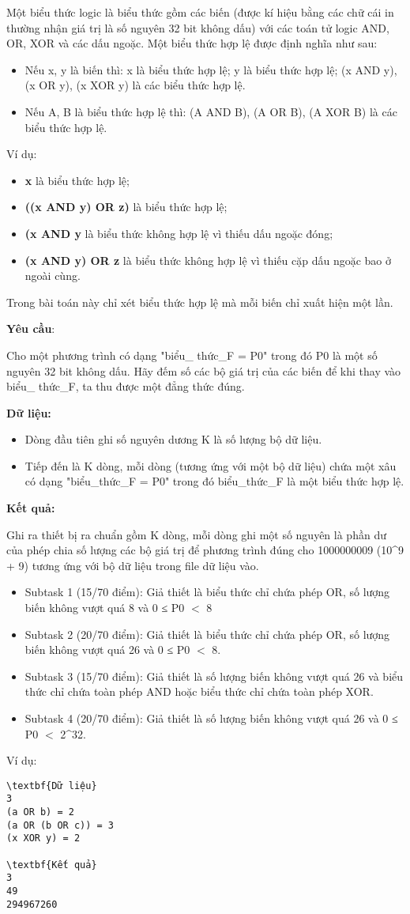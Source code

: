 

Một biểu thức logic là biểu thức gồm các biến (được kí hiệu bằng các chữ cái in thường nhận giá trị là số nguyên 32 bit không dấu) với các toán tử logic AND, OR, XOR và các dấu ngoặc. Một biểu thức hợp lệ được định nghĩa như sau:
\begin{itemize}
	\item Nếu x, y là biến thì: x là biểu thức hợp lệ; y là biểu thức hợp lệ; (x AND y), (x OR y), (x XOR y) là các biểu thức hợp lệ.
	\item Nếu A, B là biểu thức hợp lệ thì: (A AND B), (A OR B), (A XOR B) là các biểu thức hợp lệ.
\end{itemize}

Ví dụ:
\begin{itemize}
	\item \textbf{x} là biểu thức hợp lệ;
	\item \textbf{((x AND y) OR z)} là biểu thức hợp lệ;
	\item \textbf{(x AND y} là biểu thức không hợp lệ vì thiếu dấu ngoặc đóng;
	\item \textbf{(x AND y) OR z} là biểu thức không hợp lệ vì thiếu cặp dấu ngoặc bao ở ngoài cùng.
\end{itemize}

Trong bài toán này chỉ xét biểu thức hợp lệ mà mỗi biến chỉ xuất hiện một lần.

\textbf{Yêu cầu}:

Cho một phương trình có dạng "biểu\_ thức\_F = P0" trong đó P0 là một số nguyên 32 bit không dấu. Hãy đếm số các bộ giá trị của các biến để khi thay vào biểu\_ thức\_F, ta thu được một đẳng thức đúng.

\textbf{Dữ liệu:} 
\begin{itemize}
	\item Dòng đầu tiên ghi số nguyên dương K là số lượng bộ dữ liệu.
	\item Tiếp đến là K dòng, mỗi dòng (tương ứng với một bộ dữ liệu) chứa một xâu có dạng "biểu\_thức\_F = P0" trong đó biểu\_thức\_F là một biểu thức hợp lệ.
\end{itemize}

\textbf{Kết quả:}

Ghi ra thiết bị ra chuẩn gồm K dòng, mỗi dòng ghi một số nguyên là phần dư của phép chia số lượng các bộ giá trị để phương trình đúng cho 1000000009 (10\textasciicircum9 + 9) tương ứng với bộ dữ liệu trong file dữ liệu vào.
\begin{itemize}
	\item Subtask 1 (15/70 điểm): Giả thiết là biểu thức chỉ chứa phép OR, số lượng biến không vượt quá 8 và 0 ≤ P0 $<$ 8
	\item Subtask 2 (20/70 điểm): Giả thiết là biểu thức chỉ chứa phép OR, số lượng biến không vượt quá 26 và 0 ≤ P0 $<$ 8.
	\item Subtask 3 (15/70 điểm): Giả thiết là số lượng biến không vượt quá 26 và biểu thức chỉ chứa toàn phép AND hoặc biểu thức chỉ chứa toàn phép XOR.
	\item Subtask 4 (20/70 điểm): Giả thiết là số lượng biến không vượt quá 26 và 0 ≤ P0 $<$ 2\textasciicircum32.
\end{itemize}

Ví dụ:
\begin{verbatim}
\textbf{Dữ liệu}
3
(a OR b) = 2
(a OR (b OR c)) = 3
(x XOR y) = 2

\textbf{Kết quả}
3
49
294967260\end{verbatim}

 